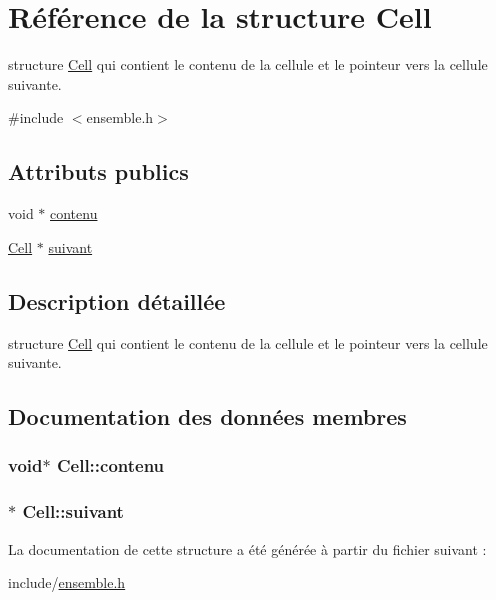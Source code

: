 \hypertarget{structCell}{\section{\-Référence de la structure \-Cell}
\label{structCell}
}


structure \hyperlink{structCell}{\-Cell} qui contient le contenu de la cellule et le pointeur vers la cellule suivante.  




{\ttfamily \#include $<$ensemble.\-h$>$}

\subsection*{\-Attributs publics}
\begin{DoxyCompactItemize}
\item 
void $\ast$ \hyperlink{structCell_af2d81fa8eccad6f58d37802fc1908a61}{contenu}
\item 
\hyperlink{structCell}{\-Cell} $\ast$ \hyperlink{structCell_ad7eff379c5dfaefcb19f09638109dbaf}{suivant}
\end{DoxyCompactItemize}


\subsection{\-Description détaillée}
structure \hyperlink{structCell}{\-Cell} qui contient le contenu de la cellule et le pointeur vers la cellule suivante. 

\subsection{\-Documentation des données membres}
\hypertarget{structCell_af2d81fa8eccad6f58d37802fc1908a61}{
\subsubsection[{contenu}]{\setlength{\rightskip}{0pt plus 5cm}void$\ast$ {\bf \-Cell\-::contenu}}}\label{structCell_af2d81fa8eccad6f58d37802fc1908a61}
\hypertarget{structCell_ad7eff379c5dfaefcb19f09638109dbaf}{
\subsubsection[{suivant}]{$\ast$ {\bf \-Cell\-::suivant}}}\label{structCell_ad7eff379c5dfaefcb19f09638109dbaf}


\-La documentation de cette structure a été générée à partir du fichier suivant \-:\begin{DoxyCompactItemize}
\item 
include/\hyperlink{ensemble_8h}{ensemble.\-h}\end{DoxyCompactItemize}
